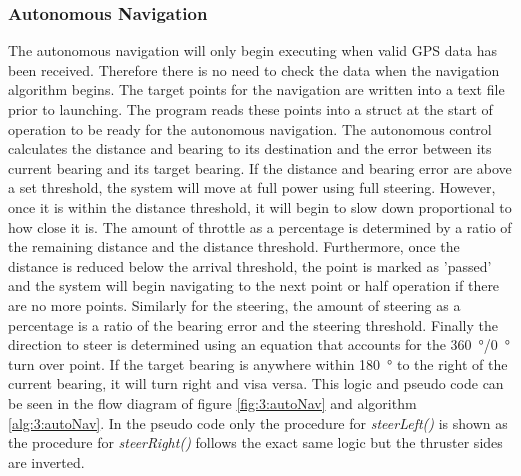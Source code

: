 \subsubsection{Autonomous Navigation}
The autonomous navigation will only begin executing when valid GPS data has been received. Therefore there is no need to check the data when the navigation algorithm begins. The target points for the navigation are written into a text file prior to launching. The program reads these points into a struct at the start of operation to be ready for the autonomous navigation. The autonomous control calculates the distance and bearing to its destination and the error between its current bearing and its target bearing. If the distance and bearing error are above a set threshold, the system will move at full power using full steering. However, once it is within the distance threshold, it will begin to slow down proportional to how close it is. The amount of throttle as a percentage is determined by a ratio of the remaining distance and the distance threshold. Furthermore, once the distance is reduced below the arrival threshold, the point is marked as 'passed' and the system will begin navigating to the next point or half operation if there are no more points. Similarly for the steering, the amount of steering as a percentage is a ratio of the bearing error and the steering threshold. Finally the direction to steer is determined using an equation that accounts for the \SI{360}{\degree}/\SI{0}{\degree} turn over point. If the target bearing is anywhere within \SI{180}{\degree} to the right of the current bearing, it will turn right and visa versa. This logic and pseudo code can be seen in the flow diagram of figure \ref{fig:3:autoNav} and algorithm \ref{alg:3:autoNav}. In the pseudo code only the procedure for \emph{steerLeft()} is shown as the procedure for \emph{steerRight()} follows the exact same logic but the thruster sides are inverted. 
